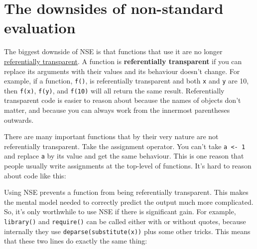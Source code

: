 \hypertarget{nse-downsides}{%
\section{The downsides of non-standard evaluation}\label{nse-downsides}}

The biggest downside of NSE is that functions that use it are no longer
\href{http://en.wikipedia.org/wiki/Referential_transparency_(computer_science)}{referentially
transparent}. A function is \textbf{referentially transparent} if you
can replace its arguments with their values and its behaviour doesn't
change. For example, if a function, \texttt{f()}, is referentially
transparent and both \texttt{x} and \texttt{y} are 10, then
\texttt{f(x)}, \texttt{f(y)}, and \texttt{f(10)} will all return the
same result. Referentially transparent code is easier to reason about
because the names of objects don't matter, and because you can always
work from the innermost parentheses outwards.

There are many important functions that by their very nature are not
referentially transparent. Take the assignment operator. You can't take
\texttt{a\ \textless{}-\ 1} and replace \texttt{a} by its value and get
the same behaviour. This is one reason that people usually write
assignments at the top-level of functions. It's hard to reason about
code like this:

\begin{Shaded}
\begin{Highlighting}[]
\StringTok{ }
\StringTok{ }
\StringTok{ }\OperatorTok{+}\StringTok{ }\NormalTok{) }\OperatorTok{>}\StringTok{ }\StringTok{ }\OperatorTok{-}\StringTok{ }\NormalTok{)) \{}
\StringTok{ }\OperatorTok{+}\StringTok{ }
\NormalTok{\}}
\end{Highlighting}
\end{Shaded}

Using NSE prevents a function from being referentially transparent. This
makes the mental model needed to correctly predict the output much more
complicated. So, it's only worthwhile to use NSE if there is significant
gain. For example, \texttt{library()} and \texttt{require()} can be
called either with or without quotes, because internally they use
\texttt{deparse(substitute(x))} plus some other tricks. This means that
these two lines do exactly the same thing:

